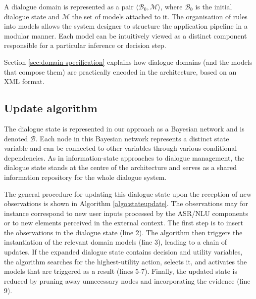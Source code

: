 A dialogue domain is represented as a pair $\langle \mathcal{B}_0, \mathcal{M} \rangle$, where $\mathcal{B}_0$ is the initial dialogue state  and $\mathcal{M}$ the set of models attached to it. The organisation of rules into models allows the system designer to structure the application pipeline in a modular manner. Each model can be intuitively viewed as a distinct component responsible for a particular inference or decision step. 

Section \ref{sec:domain-specification} explains how dialogue domains (and the models that compose them) are practically encoded in the \opendial{} architecture, based on an XML format. 

\subsection{Update algorithm} 


The dialogue state is represented in our approach as a Bayesian network and is denoted $\mathcal{B}$. Each node in this Bayesian network represents a distinct state variable and can be connected to other variables through various conditional dependencies. As in information-state approaches to dialogue management, the dialogue state stands at the centre of the architecture and serves as a shared information repository for the whole dialogue system. 

The general procedure for updating this dialogue state upon the reception of new observations is shown in Algorithm \ref{algo:stateupdate}. The observations may for instance correspond to new user inputs processed by the ASR/NLU components or to new elements perceived in the external context. The first step is to insert the observations in the dialogue state (line 2). The algorithm then triggers the instantiation of the relevant domain models (line 3), leading to a chain of updates.  If the expanded dialogue state contains decision and utility variables, the algorithm searches for the highest-utility action, selects it, and activates the models that are triggered as a result (lines 5-7). Finally, the updated state is reduced by pruning away unnecessary nodes and incorporating the evidence (line 9). 

